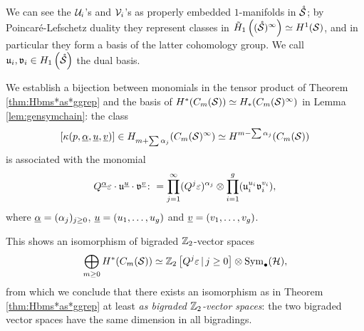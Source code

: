 \begin{defn}
 \label{defn:dualHbasis}
We can see the $\mathcal{U}_i$'s and $\mathcal{V}_i$'s as properly embedded $1$-manifolds in $\mathring{\mathcal{S}}$;
by Poincaré-Lefschetz duality they represent classes in $\tilde{H}_1\left((\mathring{\mathcal{S}})^{\infty}\right)\simeq H^1(\mathcal{S})$,
and in particular they form a basis
of the latter cohomology group. We call $\mathfrak{u}_i,\mathfrak{v}_i\in H_1\left(\mathring{\mathcal{S}}\right)$ the dual basis.

\end{defn}
We establish a bijection between monomials in the tensor product of Theorem \ref{thm:Hbms*as*ggrep}
and the basis of $H^*(C_m(\mathcal{S}))\simeq H_*(C_m(\mathcal{S})^{\infty})$ in Lemma \ref{lem:gensymchain}:
the class 
\[
[\kappa(p,\underline{\alpha},\underline{u},\underline{v})]\in H_{m+\sum\alpha_j}(C_m(\mathcal{S})^{\infty})\simeq H^{m-\sum\alpha_j}(C_m(\mathcal{S}))
\]
is associated with the monomial
\[
Q^{\underline{\alpha}}\varepsilon\cdot\mathfrak{u}^{\underline{u}}\cdot\mathfrak{v}^{\underline{v}}\colon =\prod_{j=1}^{\infty}(Q^j\varepsilon)^{\alpha_j}\otimes \prod_{i=1}^g(\mathfrak{u}_i^{u_i}\mathfrak{v}_i^{v_i}),
\]
where $\underline{\alpha}=(\alpha_j)_{j\geq 0}$, $\underline{u}=(u_1,\dots,u_g)$ and $\underline{v}=(v_1,\dots,v_g)$.

This shows an isomorphism of bigraded $\mathbb{Z}_2$-vector spaces
\begin{equation}\label{eq:isovectorspaces}
  \bigoplus_{m\geq 0} H^*(C_m(\mathcal{S}))\simeq \mathbb{Z}_2\left[Q^j\varepsilon\,|\, j\geq 0\right]\otimes\operatorname{Sym}_{\bullet}(\mathcal{H}),
\end{equation}
from which we conclude that
there exists an isomorphism as in Theorem \ref{thm:Hbms*as*ggrep}
at least \emph{as bigraded $\mathbb{Z}_2$-vector spaces}: the two bigraded
vector spaces have the same dimension in all bigradings.